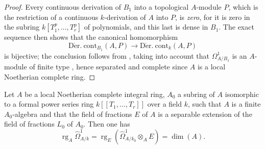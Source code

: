 \begin{proof}
Every continuous derivation of $B_1$ into a topological $A$-module $P$, which is the restriction of a continuous $k$-derivation of $A$ into $P$, is \emph{zero}, for it is zero in the subring $k[T_1^p,\ldots,T_r^p]$ of polynomials, and this last is dense in $B_1$.
The exact sequence  then shows that the canonical homomorphism
\[
  \operatorname{D\acute{e}r.\ cont}_{B_1}(A,P)\to\operatorname{D\acute{e}r.\ cont}_k(A,P)
\]
is bijective; the conclusion follows from , taking into account that $\Omega^1_{A/B_1}$ is an $A$-module of finite type , hence separated and complete since $A$ is a local Noetherian complete ring.
\end{proof}

\begin{proposition}[21.9.5]
\label{0.21.9.5}
Let $A$ be a local Noetherian complete integral ring, $A_0$ a subring of $A$ isomorphic to a formal power series ring $k[[T_1,\ldots,T_r]]$ over a field $k$, such that $A$ is a finite $A_0$-algebra and that the field of fractions $E$ of $A$ is a separable extension of the field of fractions $L_0$ of $A_0$.
Then one has
\begin{equation}
\tag{21.9.5.1}
  \label{0.21.9.5.1}
  \operatorname{rg}_A\widehat{\Omega}^1_{A/k}=\operatorname{rg}_E(\widehat{\Omega}^1_{A/k_0}\otimes_A E)=\dim(A).
\end{equation}
\end{proposition}


